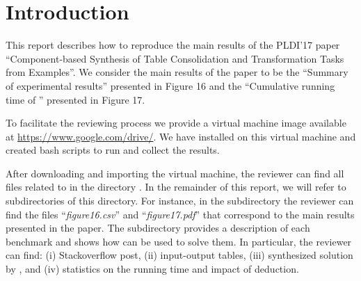 \section{Introduction}

This report describes how to reproduce the main results of the PLDI'17 paper ``Component-based Synthesis of Table Consolidation and Transformation Tasks from Examples''. We consider the main results of the paper to be the ``Summary of experimental results'' presented in Figure 16 and the ``Cumulative running time of \toolname'' presented in Figure 17.

To facilitate the reviewing process we provide a virtual machine image available at \url{https://www.google.com/drive/}. We have installed \toolname on this virtual machine and created bash scripts to run \toolname and collect the results.

After downloading and importing the virtual machine, the reviewer can find all files related to \toolname in the directory . In the remainder of this report, we will refer to subdirectories of this directory. For instance, in the subdirectory  the reviewer can find the files ``\emph{figure16.csv}'' and ``\emph{figure17.pdf}'' that correspond to the main results presented in the paper. The subdirectory  provides a description of each benchmark and shows how \toolname can be used to solve them. In particular, the reviewer can find: (i) Stackoverflow post, (ii) input-output tables, (iii) synthesized solution by \toolname, and (iv) statistics on the running time and impact of deduction.
